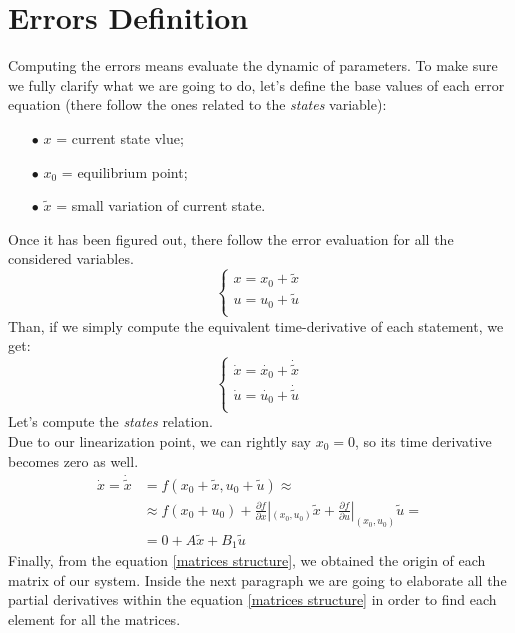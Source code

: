 \documentclass[a4paper,12pt,titlepage]{report}
\begin{document}
\section{Errors Definition}
	Computing the errors means evaluate the dynamic of parameters. To make sure we fully clarify what we are going to do, let's define the base values of each error equation (there follow the ones related to the \textit{states} variable):
		\begin{itemize}
			\item[$\bullet$] $x$ = current state vlue;
			\item[$\bullet$] $x_{0}$ = equilibrium point;
			\item[$\bullet$] $\tilde{x}$ = small variation of current state.
		\end{itemize}
	Once it has been figured out, there follow the error evaluation for all the considered variables.
		\begin{equation*}
			\begin{cases}
				x = x_{0} + \tilde{x} \\
				u = u_{0} + \tilde{u} \\
			\end{cases}
		\end{equation*}
	Than, if we simply compute the equivalent time-derivative of each statement, we get:
		\begin{equation*}
			\begin{cases}
				\dot{x} = \dot{x_{0}} + \dot{\tilde{x}} \\
				\dot{u} = \dot{u_{0}} + \dot{\tilde{u}} \\
			\end{cases}
		\end{equation*}
	Let's compute the \textit{states} relation.\\
	Due to our linearization point, we can rightly say $x_{0} = 0 $, so its time derivative becomes zero as well.
		\begin{equation} \label{matrices structure}
			\begin{split}
				\dot{x}  = \dot{\tilde{x}} &= f(x_{0}+\tilde{x},u_{0}+\tilde{u})\approx \\
				&\approx f(x_{0}+u_{0}) + \frac{\partial f}{\partial x} |_{(x_{0},u_{0})} \tilde{x} + \frac{\partial f}{\partial u} |_{(x_{0},u_{0})} \tilde{u} = \\
				&= 0 + A \tilde{x} + B_{1} \tilde{u} 
			\end{split}
		\end{equation}
	Finally, from the equation \ref{matrices structure}, we obtained the origin of each matrix of our system. Inside the next paragraph we are going to elaborate all the partial derivatives within the equation \ref{matrices structure} in order to find each element for all the matrices.
\end{document}
